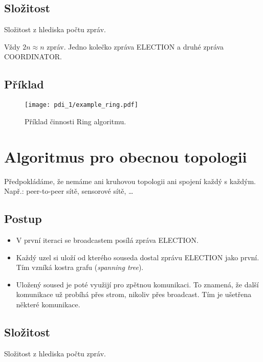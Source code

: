 \subsection*{Složitost}

Složitost z hlediska počtu zpráv.

\bigskip\noindent Vždy $2n \approx n$ zpráv. Jedno kolečko  zpráva ELECTION a druhé zpráva COORDINATOR.

\subsection*{Příklad}

\begin{figure}[H]
    \centering
    \texttt{[image: pdi\_1/example\_ring.pdf]}
    \caption{Příklad činnosti Ring algoritmu.}
\end{figure}


\section{Algoritmus pro obecnou topologii}

Předpokládáme, že nemáme ani kruhovou topologii ani spojení každý s každým. Např.: peer-to-peer sítě, sensorové sítě, \dots

\subsection*{Postup}

\begin{itemize}
    \item V první iteraci se broadcastem posílá zpráva ELECTION.
    \item Každý uzel si uloží od kterého souseda dostal zprávu ELECTION jako první. Tím vzníká kostra grafu (\textit{spanning tree}).
    \item Uložený soused je poté využijí pro zpětnou komunikaci. To znamená, že další komunikace už probíhá přes strom, nikoliv přes broadcast. Tím je ušetřena některé komunikace.
\end{itemize}

\subsection*{Složitost}

Složitost z hlediska počtu zpráv.

